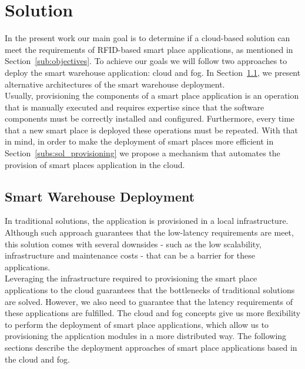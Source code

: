 
\section{Solution}
\label{sec:solution}

In the present work our main goal is to determine if a cloud-based solution can meet the
requirements of RFID-based smart place applications, as mentioned in Section~\ref{sub:objectives}.
To achieve our goals we will follow two approaches to deploy the smart warehouse application: cloud
and fog. In Section~\ref{sub:sol_smart_warehouse_deployment}, we present alternative architectures
of the smart warehouse deployment.\\

Usually, provisioning the components of a smart place application is an operation that is manually executed and
requires expertise since that the software components must be correctly installed and configured.
Furthermore, every time that a new smart place is deployed these operations must be repeated. With
that in mind, in order to make the deployment of smart places more efficient in Section~\ref{subs:sol_provisioning}
we propose a mechanism that automates the provision of smart places application in the cloud.\\

\subsection{Smart Warehouse Deployment}
\label{sub:sol_smart_warehouse_deployment}
In traditional solutions, the application is provisioned in a local infrastructure. Although such
approach guarantees that the low-latency requirements are meet, this solution comes with several
downsides - such as the low scalability, infrastructure and maintenance costs - that can be a
barrier for these applications.\\

Leveraging the infrastructure required to provisioning the smart place applications to the cloud
guarantees that the bottlenecks of traditional solutions are solved. However, we also need to
guarantee that the latency requirements of these applications are fulfilled. The cloud and fog concepts
give us more flexibility to perform the deployment of smart place applications, which allow us to
provisioning the application modules in a more distributed way. The following sections describe
the deployment approaches of smart place applications based in the cloud and fog.\\

